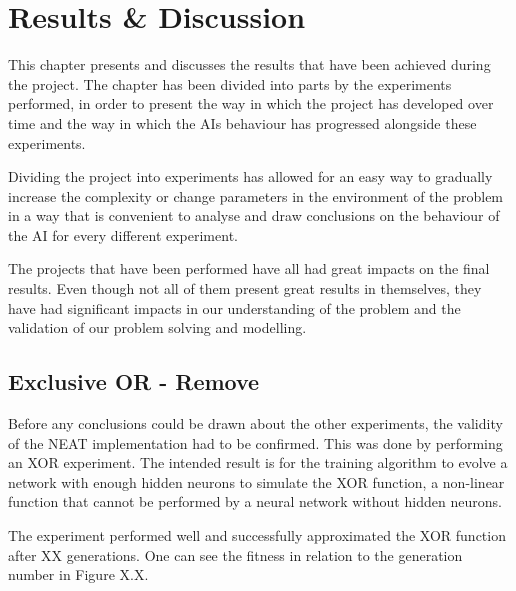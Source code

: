 
\chapter{Results \& Discussion}
This chapter presents and discusses the results that have been achieved during the project. The chapter has been divided into parts by the experiments performed, in order to present the way in which the project has developed over time and the way in which the AIs behaviour has progressed alongside these experiments.

Dividing the project into experiments has allowed for an easy way to gradually increase the complexity or change parameters in the environment of the problem in a way that is convenient to analyse and draw conclusions on the behaviour of the AI for every different experiment.

The projects that have been performed have all had great impacts on the final results. Even though not all of them present great results in themselves, they have had significant impacts in our understanding of the problem and the validation of our problem solving and modelling.


\section{Exclusive OR - Remove}
Before any conclusions could be drawn about the other experiments, the validity of the NEAT implementation had to be confirmed. This was done by performing an XOR experiment. The intended result is for the training algorithm to evolve a network with enough hidden neurons to simulate the XOR function, a non-linear function that cannot be performed by a neural network without hidden neurons.

The experiment performed well and successfully approximated the XOR function after XX generations. One can see the fitness in relation to the generation number in Figure X.X.

